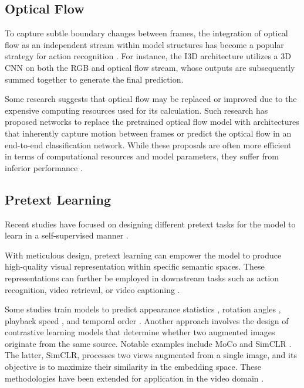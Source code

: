 \subsection{Optical Flow}
To capture subtle boundary changes between frames, the integration of optical flow as an independent stream within model structures has become a popular strategy for action recognition \parencite{sevilla2019integration, tran2015learning, carreira2017quo}. For instance, the I3D architecture \parencite{carreira2017quo} utilizes a 3D CNN on both the RGB and optical flow stream, whose outputs are subsequently summed together to generate the final prediction. 


Some research suggests that optical flow may be replaced or improved due to the expensive computing resources used for its calculation. Such research has proposed networks to replace the pretrained optical flow model with architectures that inherently capture motion between frames or predict the optical flow in an end-to-end classification network. While these proposals are often more efficient in terms of computational resources and model parameters, they suffer from inferior performance \parencite{Lee_2018_ECCV, 8354283, Piergiovanni_2019_CVPR}.

\subsection{Pretext Learning}
Recent studies have focused on designing different pretext tasks for the model to learn in a self-supervised manner \parencite{wang2022internvideo}.

With meticulous design, pretext learning can empower the model to produce high-quality visual representation within specific semantic spaces. These representations can further be employed in downstream tasks such as action recognition, video retrieval, or video captioning \parencite{10.1145/3577925}.

Some studies train models to predict appearance statistics \parencite{Wang_2019_CVPR}, rotation angles \parencite{DBLP:journals/corr/abs-1811-11387}, playback speed \parencite{Yao_2020_CVPR, 10.1007/978-3-030-58520-4_30}, and temporal order \parencite{10.1007/978-3-030-58604-1_26}. Another approach involves the design of contrastive learning models that determine whether two augmented images originate from the same source. Notable examples include MoCo \parencite{finn2017model} and SimCLR \parencite{pmlr-v119-chen20j}. The latter, SimCLR, processes two views augmented from a single image, and its objective is to maximize their similarity in the embedding space. These methodologies have been extended for application in the video domain \parencite{Feichtenhofer_2021_CVPR}.

